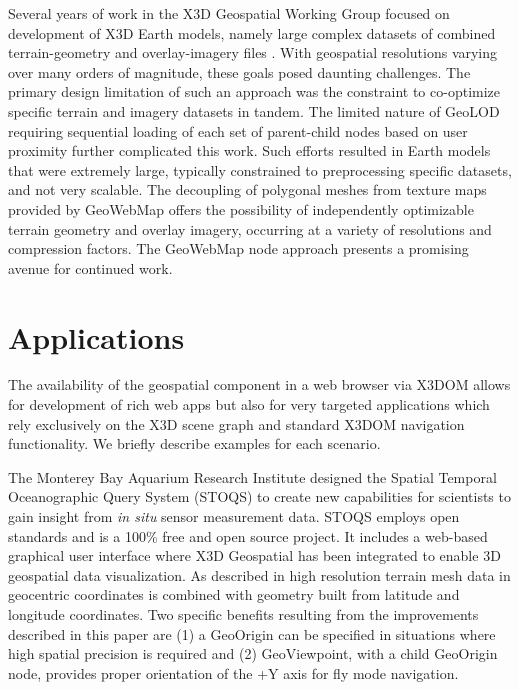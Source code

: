 \documentclass[review]{acmsiggraph}            %
\begin{document}
Several years of work in the X3D Geospatial Working Group focused on development of X3D Earth models, namely large complex datasets of combined terrain-geometry and overlay-imagery files \cite{yoo12}.  With geospatial resolutions varying over many orders of magnitude, these goals posed daunting challenges.  The primary design limitation of such an approach was the constraint to co-optimize specific terrain and imagery datasets in tandem.  The limited nature of GeoLOD requiring sequential loading of each set of parent-child nodes based on user proximity further complicated this work.  Such efforts resulted in Earth models that were extremely large, typically constrained to preprocessing specific datasets, and not very scalable.  The decoupling of polygonal meshes from texture maps provided by GeoWebMap offers the possibility of independently optimizable terrain geometry and overlay imagery, occurring at a variety of resolutions and compression factors. The GeoWebMap node approach presents a promising avenue for continued work.

\section{Applications}

The availability of the geospatial component in a web browser via X3DOM allows for development of
rich  web apps but also for very targeted applications which rely exclusively on the X3D scene graph
and standard X3DOM navigation functionality. We briefly describe examples for each scenario.

The Monterey Bay Aquarium Research Institute designed the Spatial Temporal Oceanographic Query
System (STOQS) \cite{stoqsyoutube} to create new capabilities for scientists to gain insight from
\textit{in situ} sensor measurement data. STOQS employs open standards and is a 100\% free and open
source project. It includes a web-based graphical user interface where X3D Geospatial has been
integrated to enable 3D geospatial data visualization. As described in \cite{mccann14} high
resolution terrain mesh data in geocentric coordinates is combined with geometry built from latitude
and longitude coordinates. Two specific benefits resulting from the improvements described in this
paper are (1) a GeoOrigin can be specified in situations where high spatial precision is required and
(2) GeoViewpoint, with a child GeoOrigin node, provides proper orientation of the +Y axis for fly
mode navigation.
\end{document}
